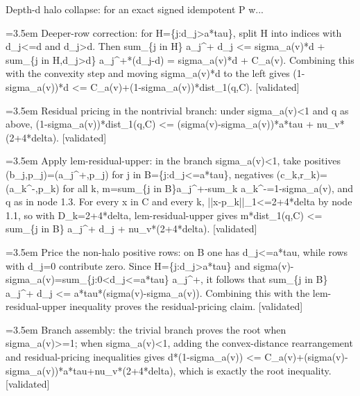 \documentclass{article}
\newcommand{\step}[1]{\par\noindent\hangindent=3.5em\hangafter=1%
  \makebox[3.5em][l]{\textbf{#1.}}}
\newcommand{\steptag}[1]{\hfill{\small\textsf{[#1]}}}
\begin{document}
\begin{proofbox}{Depth-d halo collapse: for an exact signed idempotent P w...}
\step{1.4.2} Deeper-row correction: for H=\{j:d\_j>a*tau\}, split H into indices with d\_j<=d and d\_j>d. Then sum\_\{j in H\} a\_j\textasciicircum{}+ d\_j <= sigma\_a(v)*d + sum\_\{j in H,d\_j>d\} a\_j\textasciicircum{}+*(d\_j-d) = sigma\_a(v)*d + C\_a(v). Combining this with the convexity step and moving sigma\_a(v)*d to the left gives (1-sigma\_a(v))*d <= C\_a(v)+(1-sigma\_a(v))*dist\_1(q,C). \steptag{validated} \\[4pt]
\step{1.5} Residual pricing in the nontrivial branch: under sigma\_a(v)<1 and q as above, (1-sigma\_a(v))*dist\_1(q,C) <= (sigma(v)-sigma\_a(v))*a*tau + nu\_v*(2+4*delta). \steptag{validated} \\[6pt]
\step{1.5.1} Apply lem-residual-upper: in the branch sigma\_a(v)<1, take positives (b\_j,p\_j)=(a\_j\textasciicircum{}+,p\_j) for j in B=\{j:d\_j<=a*tau\}, negatives (c\_k,r\_k)=(a\_k\textasciicircum{}-,p\_k) for all k, m=sum\_\{j in B\}a\_j\textasciicircum{}+-sum\_k a\_k\textasciicircum{}-=1-sigma\_a(v), and q as in node 1.3. For every x in C and every k, ||x-p\_k||\_1<=2+4*delta by node 1.1, so with D\_k=2+4*delta, lem-residual-upper gives m*dist\_1(q,C) <= sum\_\{j in B\} a\_j\textasciicircum{}+ d\_j + nu\_v*(2+4*delta). \steptag{validated} \\[4pt]
\step{1.5.2} Price the non-halo positive rows: on B one has d\_j<=a*tau, while rows with d\_j=0 contribute zero. Since H=\{j:d\_j>a*tau\} and sigma(v)-sigma\_a(v)=sum\_\{j:0<d\_j<=a*tau\} a\_j\textasciicircum{}+, it follows that sum\_\{j in B\} a\_j\textasciicircum{}+ d\_j <= a*tau*(sigma(v)-sigma\_a(v)). Combining this with the lem-residual-upper inequality proves the residual-pricing claim. \steptag{validated} \\[4pt]
\step{1.6} Branch assembly: the trivial branch proves the root when sigma\_a(v)>=1; when sigma\_a(v)<1, adding the convex-distance rearrangement and residual-pricing inequalities gives d*(1-sigma\_a(v)) <= C\_a(v)+(sigma(v)-sigma\_a(v))*a*tau+nu\_v*(2+4*delta), which is exactly the root inequality. \steptag{validated} \\[4pt]
\end{proofbox}
\end{document}
